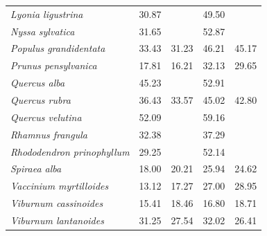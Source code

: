 \documentclass{article}
\begin{document}
\begin{table}[ht]
\begin{tabular}{lrrrr}
  \textit{Lyonia ligustrina} & 30.87 &  & 49.50 &  \\ 
  \textit{Nyssa sylvatica} & 31.65 &  & 52.87 &  \\ 
  \textit{Populus grandidentata} & 33.43 & 31.23 & 46.21 & 45.17 \\ 
  \textit{Prunus pensylvanica} & 17.81 & 16.21 & 32.13 & 29.65 \\ 
  \textit{Quercus alba} & 45.23 &  & 52.91 &  \\ 
  \textit{Quercus rubra} & 36.43 & 33.57 & 45.02 & 42.80 \\ 
  \textit{Quercus velutina} & 52.09 &  & 59.16 &  \\ 
  \textit{Rhamnus frangula} & 32.38 &  & 37.29 &  \\ 
  \textit{Rhododendron prinophyllum} & 29.25 &  & 52.14 &  \\ 
  \textit{Spiraea alba} & 18.00 & 20.21 & 25.94 & 24.62 \\ 
  \textit{Vaccinium myrtilloides} & 13.12 & 17.27 & 27.00 & 28.95 \\ 
  \textit{Viburnum cassinoides} & 15.41 & 18.46 & 16.80 & 18.71 \\ 
  \textit{Viburnum lantanoides} & 31.25 & 27.54 & 32.02 & 26.41 \\ 
   \hline
\end{tabular}
\end{table}
\end{document}
